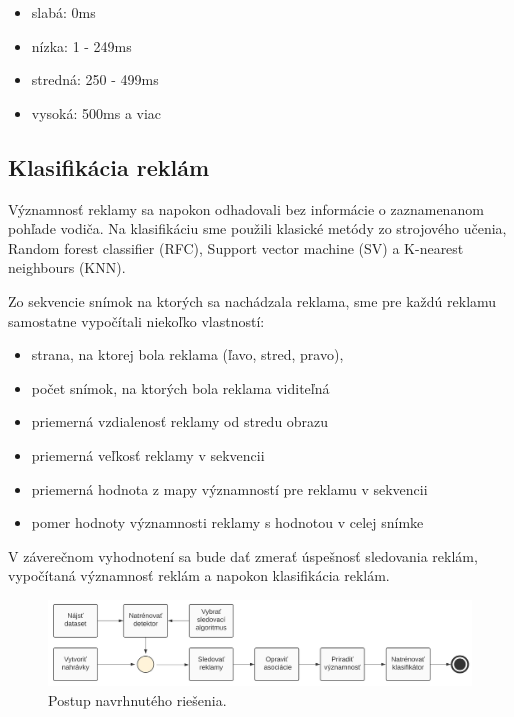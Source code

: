 \begin{itemize}
  \item slabá: 0ms
  \item nízka: 1 - 249ms
  \item stredná: 250 - 499ms
  \item vysoká: 500ms a viac 
\end{itemize}


\subsection{Klasifikácia reklám}

Významnosť reklamy sa napokon odhadovali bez informácie o zaznamenanom pohľade vodiča. Na klasifikáciu sme použili klasické metódy zo strojového učenia, Random forest classifier (RFC), Support vector machine (SV) a K-nearest neighbours (KNN). 

Zo sekvencie snímok na ktorých sa nachádzala reklama, sme pre každú reklamu samostatne vypočítali niekoľko vlastností:

\begin{itemize}
  \item strana, na ktorej bola reklama (ľavo, stred, pravo),
  \item počet snímok, na ktorých bola reklama viditeľná
  \item priemerná vzdialenosť reklamy od stredu obrazu
  \item priemerná veľkosť reklamy v sekvencii
  \item priemerná hodnota z mapy významností pre reklamu v sekvencii
  \item pomer hodnoty významnosti reklamy s hodnotou v celej snímke
\end{itemize}

V záverečnom vyhodnotení sa bude dať zmerať úspešnosť sledovania reklám, vypočítaná významnosť reklám a napokon klasifikácia reklám.
\\
\begin{figure}[ht]
    \centering
    \includegraphics[width=1\textwidth]{images/02/plan2.png}
    \caption{Postup navrhnutého riešenia.}
    \label{img:road}
\end{figure}